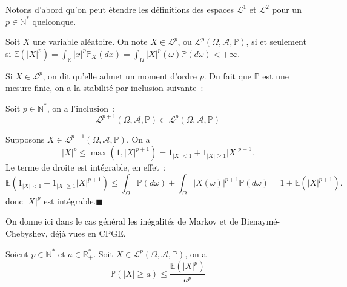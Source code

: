 Notons d'abord qu'on peut étendre les définitions des espaces
\(\mathcal{L}^1\) et \(\mathcal{L}^2\) pour un \(p \in \mathbb{N}^\ast\)
quelconque.

\begin{definition}\label{IV-espace-mathcallp}

Soit \(X\) une variable aléatoire. On note \(X \in \mathcal{L}^p\), ou
\(\mathcal{L}^p(\Omega,\mathcal{A},\mathbb{P})\), si et seulement si
\(\mathbb{E}(|X|^p) = \int_\mathbb{R}|x|^p \mathbb{P}_X(dx) = \int_{\Omega} |X|^p(\omega)\mathbb{P}(d\omega) < +\infty\).
\end{definition}

Si \(X \in \mathcal{L}^p\), on dit qu'elle admet un moment d'ordre
\(p\). Du fait que \(\mathbb{P}\) est une mesure finie, on a la
stabilité par inclusion suivante~:

\begin{proposition}[{Inclusion}]\label{IV-inclusion}

Soit \(p \in \mathbb{N}^\ast\), on a l'inclusion~:
\[ \mathcal{L}^{p+1}(\Omega,\mathcal{A},\mathbb{P}) \subset \mathcal{L}^p(\Omega,\mathcal{A},\mathbb{P})\]
\end{proposition}

\begin{preuve}
Supposons \(X \in \mathcal{L}^{p+1}(\Omega,\mathcal{A},\mathbb{P})\). On
a
\[|X|^p \leq \max(1,|X|^{p+1}) = 1_{|X| < 1} + 1_{|X| \geq 1} |X|^{p+1}.\]
Le terme de droite est intégrable, en effet~:
\[\mathbb{E}\left(1_{|X| < 1} + 1_{|X| \geq 1} |X|^{p+1}\right) \leq \int_\Omega \mathbb{P}(d\omega) + \int_\Omega |X(\omega)|^{p+1} \mathbb{P}(d\omega) = 1 + \mathbb{E}(|X|^{p+1}).\]
donc \(|X|^p\) est intégrable.\hfill$\blacksquare$
\end{preuve}

On donne ici dans le cas général les inégalités de Markov et de
Bienaymé-Chebyshev, déjà vues en CPGE.

\begin{theoreme}\label{IV-inegmarkov}

Soient \(p \in \mathbb{N}^\ast\) et \(a \in \mathbb{R}_+^\ast\). Soit
\(X \in \mathcal{L}^p(\Omega,\mathcal{A},\mathbb{P})\), on a
\[\mathbb{P}(|X|\geq a) \leq \frac{\mathbb{E}(|X|^p)}{a^p}\]
\end{theoreme}

